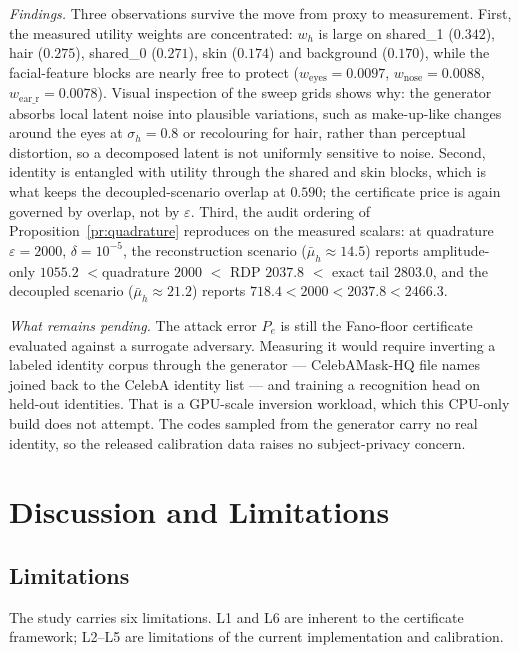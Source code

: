 \documentclass[10pt,twocolumn,letterpaper]{article}
\theoremstyle{plain}
\theoremstyle{definition}
\begin{document}
\emph{Findings.} Three observations survive the move from proxy to
measurement. First, the measured utility weights are concentrated:
$w_h$ is large on shared\_1 ($0.342$), hair ($0.275$), shared\_0 ($0.271$),
skin ($0.174$) and background ($0.170$), while the facial-feature blocks are
nearly free to protect ($w_{\mathrm{eyes}}{=}0.0097$,
$w_{\mathrm{nose}}{=}0.0088$, $w_{\mathrm{ear\_r}}{=}0.0078$). Visual
inspection of the sweep grids shows why: the generator absorbs local latent
noise into plausible variations, such as make-up-like changes around the eyes
at $\sigma_h{=}0.8$ or recolouring for hair, rather than perceptual distortion,
so a decomposed latent is not uniformly sensitive to noise. Second, identity
is entangled with utility through the shared and skin blocks, which is what
keeps the decoupled-scenario overlap at $0.590$; the certificate price is
again governed by overlap, not by $\varepsilon$. Third, the audit ordering of
Proposition~\ref{pr:quadrature} reproduces on the measured scalars: at
quadrature $\varepsilon{=}2000$, $\delta{=}10^{-5}$, the reconstruction
scenario ($\bar\mu_h\approx14.5$) reports amplitude-only $1055.2$ $<
$quadrature $2000$ $<$ RDP $2037.8$ $<$ exact tail $2803.0$, and the decoupled
scenario ($\bar\mu_h\approx21.2$) reports $718.4 < 2000 < 2037.8 < 2466.3$.

\emph{What remains pending.} The attack error $P_e$ is still the Fano-floor certificate evaluated against a
surrogate adversary. Measuring it would require inverting a labeled identity corpus
through the generator --- CelebAMask-HQ file names joined back to the CelebA identity
list --- and training a recognition head on held-out identities. That is a GPU-scale
inversion workload, which this CPU-only build does not attempt. The codes sampled from
the generator carry no real identity, so the released calibration data raises no
subject-privacy concern.

\section{Discussion and Limitations}
\label{sec:discussion}

\subsection{Limitations}

The study carries six limitations. L1 and L6 are inherent to the certificate
framework; L2--L5 are limitations of the current implementation and calibration.
\end{document}
